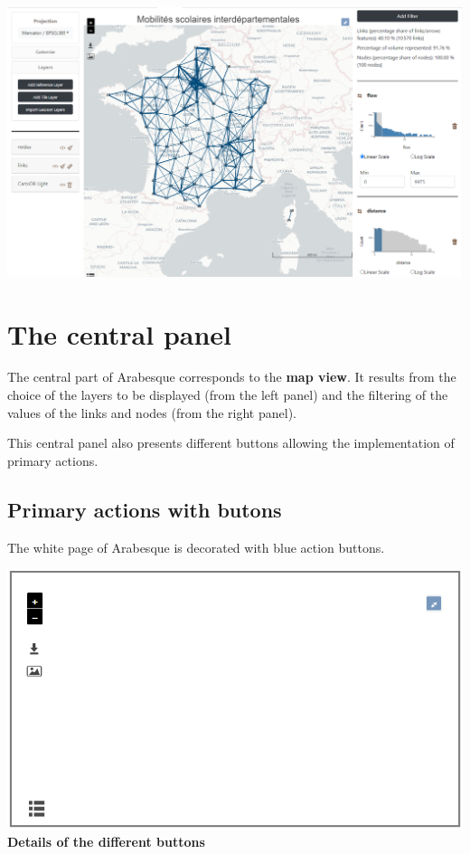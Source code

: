 \documentclass[
  letterpaper,
  DIV=11,
  numbers=noendperiod]{scrreprt}
\begin{document}
\includegraphics{images/panels_arabesque.png}

\section{The central panel}\label{the-central-panel}

The central part of Arabesque corresponds to the \textbf{map view}. It
results from the choice of the layers to be displayed (from the left
panel) and the filtering of the values of the links and nodes (from the
right panel).

This central panel also presents different buttons allowing the
implementation of primary actions.

\subsection{Primary actions with
butons}\label{primary-actions-with-butons}

The white page of Arabesque is decorated with blue action buttons.

\includegraphics{images/central_panel_clear.png} \textbf{Details of the
different buttons}
\end{document}
